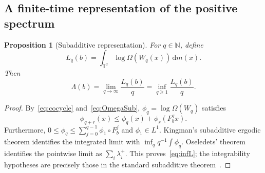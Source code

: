 \documentclass[review,12pt,times,a4paper,nopreprintline]{elsarticle}
\theoremstyle{plain}
\newtheorem{proposition}[theorem]{Proposition}
\theoremstyle{definition}
\theoremstyle{remark}
\newcommand{\T}{\mathbb T}
\newcommand{\N}{\mathbb N}
\newcommand{\dd}{\,\mathrm d}
\numberwithin{equation}{section}
\begin{document}
\subsection{A finite-time representation of the positive spectrum}
\begin{proposition}[Subadditive representation]\label{prop:subadditive}
For $q\in\N$, define
\begin{equation}\label{eq:Lq}
 L_q(b)=\int_{\T^d}\log\Omega(W_q(x))\dd m(x).
\end{equation}
Then
\begin{equation}\label{eq:infL}
 \Lambda(b)=\lim_{q\to\infty}\frac{L_q(b)}q
 =\inf_{q\geq1}\frac{L_q(b)}q.
\end{equation}
\end{proposition}
\begin{proof}
By~\eqref{eq:cocycle} and~\eqref{eq:OmegaSub}, $\phi_q=\log\Omega(W_q)$ satisfies
\[
 \phi_{q+r}(x)\leq\phi_q(x)+\phi_r(F_b^qx).
\]
Furthermore, $0\leq\phi_q\leq\sum_{j=0}^{q-1}\phi_1\circ F_b^j$ and $\phi_1\in L^1$. Kingman's subadditive ergodic theorem identifies the integrated limit with $\inf_q q^{-1}\int\phi_q$. Oseledets' theorem identifies the pointwise limit as $\sum_i\lambda_i^+$. This proves~\eqref{eq:infL}; the integrability hypotheses are precisely those in the standard subadditive theorem~\cite{Walters,KatokHasselblatt}.
\end{proof}
\end{document}
